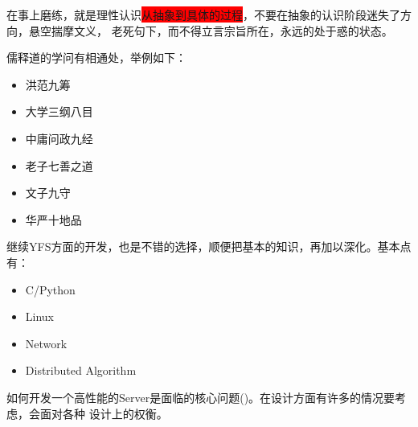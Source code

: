 在事上磨练，就是理性认识\colorbox{red}{从抽象到具体的过程}，不要在抽象的认识阶段迷失了方向，悬空揣摩文义，
老死句下，而不得立言宗旨所在，永远的处于惑的状态。

儒释道的学问有相通处，举例如下：
\begin{itemize}
  \item 洪范九筹
  \item 大学三纲八目
  \item 中庸问政九经
  \item 老子七善之道
  \item 文子九守
  \item 华严十地品
\end{itemize}

继续YFS方面的开发，也是不错的选择，顺便把基本的知识，再加以深化。基本点有：
\begin{itemize}
  \item C/Python
  \item Linux
  \item Network
  \item Distributed Algorithm
\end{itemize}
如何开发一个高性能的Server是面临的核心问题()。在设计方面有许多的情况要考虑，会面对各种
设计上的权衡。

